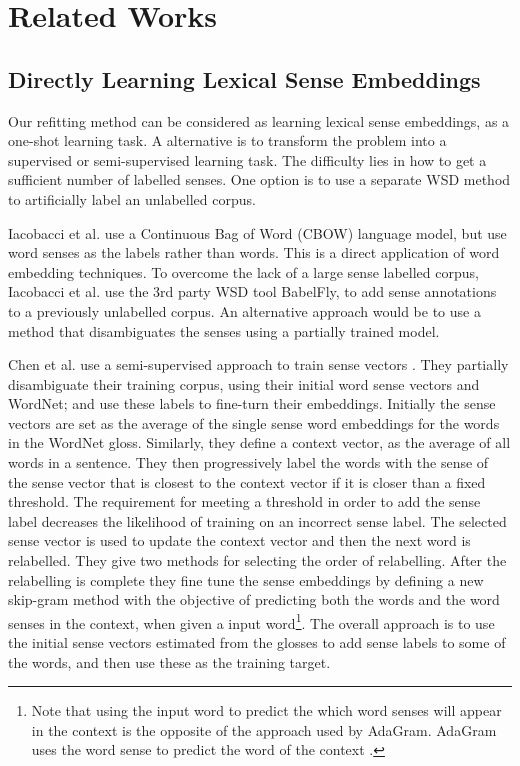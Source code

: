 \documentclass{sig-alternate}
\begin{document}
\section{Related Works} \label{relatedwords}

\subsection{Directly Learning Lexical Sense Embeddings}
Our refitting method can be considered as learning lexical sense embeddings, as a one-shot learning task. A alternative is to transform the problem into a supervised or semi-supervised learning task. The difficulty lies in how to get a sufficient number of labelled senses. One option is to use a separate WSD method to artificially label an unlabelled corpus.

Iacobacci et al. \parencite{iacobacci2015sensembed} use a Continuous Bag of Word (CBOW)  language model\parencite{mikolov2013efficient}, but use word senses as the labels rather than words. This is a direct application of word embedding techniques. To overcome the lack of a large sense labelled corpus, Iacobacci et al. use the 3rd party WSD tool BabelFly, to add sense annotations to a previously unlabelled corpus. An alternative approach would be to use a method that disambiguates the senses using a partially trained model.

Chen et al. use a semi-supervised approach to train sense vectors \parencite{Chen2014}. They partially disambiguate their training corpus, using their initial word sense vectors and WordNet; and use these labels to fine-turn their embeddings.
Initially the sense vectors are set as the average of the single sense word embeddings\parencite{mikolov2013efficient} for the words in the WordNet gloss.
Similarly, they define a context vector, as the average of all words in a sentence.
They then progressively label the words with the sense of the sense vector that is closest to the context vector if it is closer than a fixed threshold.
The requirement for meeting a threshold in order to add the sense label  decreases the likelihood of training on an incorrect sense label.
The selected sense vector is used to update the context vector and then the next word is relabelled. They give two methods for selecting the order of relabelling.
After the relabelling is complete they fine tune the sense embeddings by defining a new skip-gram method with the objective of predicting both the words and the word senses in the context, when given a input word\footnote{Note that using the input word to predict the which word senses will appear in the context is the opposite of the approach used by AdaGram. AdaGram uses the word sense to predict the word of the context \parencite{AdaGrams}.}. The overall approach is to use the initial sense vectors estimated from the glosses to add sense labels to some of the words, and then use these as the training target.
\end{document}
